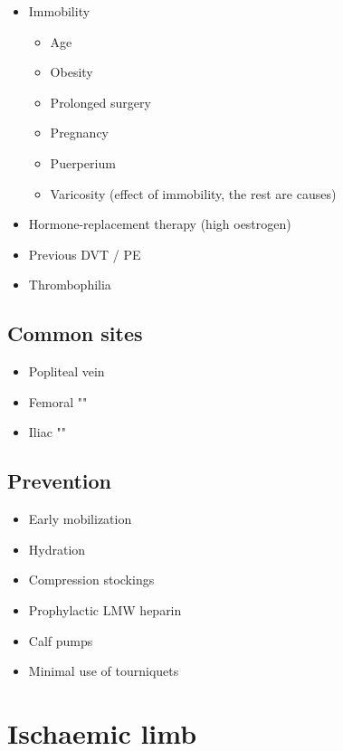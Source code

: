 \documentclass[
  14pt,
]{memoir}
\providecommand{\tightlist}{%
  \setlength{\itemsep}{0pt}\setlength{\parskip}{0pt}}
\begin{document}
\begin{itemize}
\tightlist
\item
  Immobility

  \begin{itemize}
  \tightlist
  \item
    Age
  \item
    Obesity
  \item
    Prolonged surgery
  \item
    Pregnancy
  \item
    Puerperium
  \item
    Varicosity (effect of immobility, the rest are causes)
  \end{itemize}
\item
  Hormone-replacement therapy (high oestrogen)
\item
  Previous DVT / PE
\item
  Thrombophilia
\end{itemize}

\hypertarget{common-sites}{%
\subsection{Common sites}\label{common-sites}}

\begin{itemize}
\tightlist
\item
  Popliteal vein
\item
  Femoral ""
\item
  Iliac ""
\end{itemize}

\hypertarget{prevention}{%
\subsection{Prevention}\label{prevention}}

\begin{itemize}
\tightlist
\item
  Early mobilization
\item
  Hydration
\item
  Compression stockings
\item
  Prophylactic LMW heparin
\item
  Calf pumps
\item
  Minimal use of tourniquets
\end{itemize}

\pagebreak

\hypertarget{ischaemic-limb}{%
\section{Ischaemic limb}\label{ischaemic-limb}}
\end{document}

